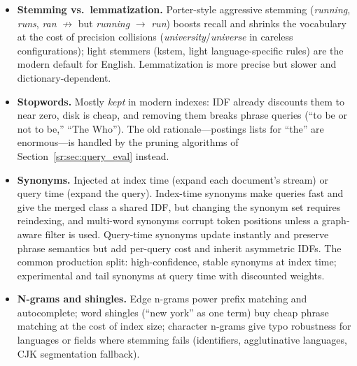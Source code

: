 \begin{itemize}
    \item \textbf{Stemming vs.\ lemmatization.} Porter-style aggressive stemming (\emph{running}, \emph{runs}, \emph{ran} $\not\rightarrow$ but \emph{running} $\rightarrow$ \emph{run}) boosts recall and shrinks the vocabulary at the cost of precision collisions (\emph{university}/\emph{universe} in careless configurations); light stemmers (kstem, light language-specific rules) are the modern default for English. Lemmatization is more precise but slower and dictionary-dependent.
    \item \textbf{Stopwords.} Mostly \emph{kept} in modern indexes: IDF already discounts them to near zero, disk is cheap, and removing them breaks phrase queries (``to be or not to be,'' ``The Who''). The old rationale---postings lists for ``the'' are enormous---is handled by the pruning algorithms of Section~\ref{sr:sec:query_eval} instead.
    \item \textbf{Synonyms.} Injected at index time (expand each document's stream) or query time (expand the query). Index-time synonyms make queries fast and give the merged class a shared IDF, but changing the synonym set requires reindexing, and multi-word synonyms corrupt token positions unless a graph-aware filter is used. Query-time synonyms update instantly and preserve phrase semantics but add per-query cost and inherit asymmetric IDFs. The common production split: high-confidence, stable synonyms at index time; experimental and tail synonyms at query time with discounted weights.
    \item \textbf{N-grams and shingles.} Edge n-grams power prefix matching and autocomplete; word shingles (``new york'' as one term) buy cheap phrase matching at the cost of index size; character n-grams give typo robustness for languages or fields where stemming fails (identifiers, agglutinative languages, CJK segmentation fallback).
\end{itemize}

